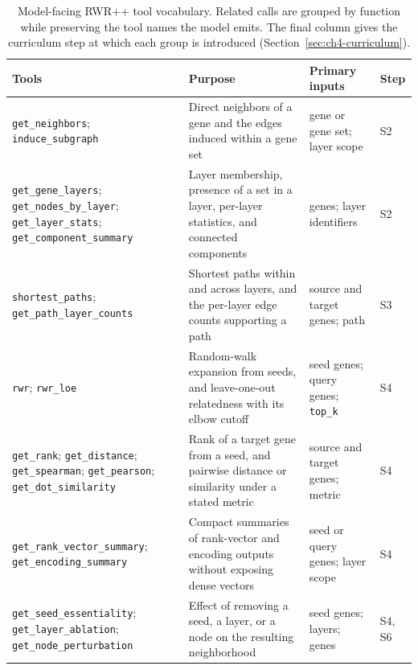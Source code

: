 \begin{table}[htb!]
\centering
\caption[Model-facing RWR++ tool vocabulary]{Model-facing RWR++ tool vocabulary. Related calls are grouped by function while preserving the tool names the model emits. The final column gives the curriculum step at which each group is introduced (Section~\ref{sec:ch4-curriculum}).}
\label{tab:ch4-tools}
\footnotesize
\setlength{\tabcolsep}{4pt}
\renewcommand{\arraystretch}{1.1}
\begin{tabularx}{\textwidth}{@{}>{\raggedright\arraybackslash}p{} Y >{\raggedright\arraybackslash}p{0.175\textwidth} >{\centering\arraybackslash}p{0.055\textwidth}@{}}
\toprule
\textbf{Tools} & \textbf{Purpose} & \textbf{Primary inputs} & \textbf{Step} \\
\midrule
\texttt{get\_neighbors}; \texttt{induce\_subgraph}
  & Direct neighbors of a gene and the edges induced within a gene set
  & gene or gene set; layer scope & S2 \\
\addlinespace
\texttt{get\_gene\_layers}; \texttt{get\_nodes\_by\_layer}; \texttt{get\_layer\_stats}; \texttt{get\_component\_summary}
  & Layer membership, presence of a set in a layer, per-layer statistics, and connected components
  & genes; layer identifiers & S2 \\
\addlinespace
\texttt{shortest\_paths}; \texttt{get\_path\_layer\_counts}
  & Shortest paths within and across layers, and the per-layer edge counts supporting a path
  & source and target genes; path & S3 \\
\addlinespace
\texttt{rwr}; \texttt{rwr\_loe}
  & Random-walk expansion from seeds, and leave-one-out relatedness with its elbow cutoff
  & seed genes; query genes; \texttt{top\_k} & S4 \\
\addlinespace
\texttt{get\_rank}; \texttt{get\_distance}; \texttt{get\_spearman}; \texttt{get\_pearson}; \texttt{get\_dot\_similarity}
  & Rank of a target gene from a seed, and pairwise distance or similarity under a stated metric
  & source and target genes; metric & S4 \\
\addlinespace
\texttt{get\_rank\_vector\_summary}; \texttt{get\_encoding\_summary}
  & Compact summaries of rank-vector and encoding outputs without exposing dense vectors
  & seed or query genes; layer scope & S4 \\
\addlinespace
\texttt{get\_seed\_essentiality}; \texttt{get\_layer\_ablation}; \texttt{get\_node\_perturbation}
  & Effect of removing a seed, a layer, or a node on the resulting neighborhood
  & seed genes; layers; genes & S4, S6 \\

\end{tabularx}
\end{table}
